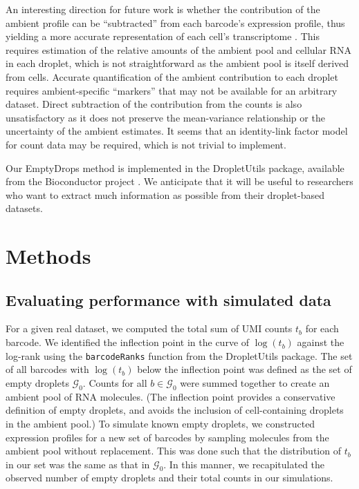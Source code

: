 \documentclass{bmcart}
\newcommand{\code}[1]{\texttt{#1}}
\begin{document}
An interesting direction for future work is whether the contribution of the ambient profile can be ``subtracted'' from each barcode's expression profile, thus yielding a more accurate representation of each cell's transcriptome \cite{young2018soupx}.
This requires estimation of the relative amounts of the ambient pool and cellular RNA in each droplet,
which is not straightforward as the ambient pool is itself derived from cells.
Accurate quantification of the ambient contribution to each droplet requires ambient-specific ``markers'' that may not be available for an arbitrary dataset.
Direct subtraction of the contribution from the counts is also unsatisfactory as it does not preserve the mean-variance relationship or the uncertainty of the ambient estimates.
It seems that an identity-link factor model for count data may be required, which is not trivial to implement. 

Our EmptyDrops method is implemented in the \textsf{DropletUtils} package, available from the Bioconductor project \cite{huber2015orchestrating}.
We anticipate that it will be useful to researchers who want to extract much information as possible from their droplet-based datasets.

\section*{Methods}

\subsection*{Evaluating performance with simulated data}
For a given real dataset, we computed the total sum of UMI counts $t_b$ for each barcode.
We identified the inflection point in the curve of $\log(t_b)$ against the log-rank using the \code{barcodeRanks} function from the \textsf{DropletUtils} package.
The set of all barcodes with $\log(t_b)$ below the inflection point was defined as the set of empty droplets $\mathcal{G}_0$.
Counts for all $b \in \mathcal{G}_0$ were summed together to create an ambient pool of RNA molecules.
(The inflection point provides a conservative definition of empty droplets, and avoids the inclusion of cell-containing droplets in the ambient pool.)
To simulate known empty droplets, we constructed expression profiles for a new set of barcodes by sampling molecules from the ambient pool without replacement.
This was done such that the distribution of $t_b$ in our set was the same as that in $\mathcal{G}_0$. 
In this manner, we recapitulated the observed number of empty droplets and their total counts in our simulations.
\end{document}
